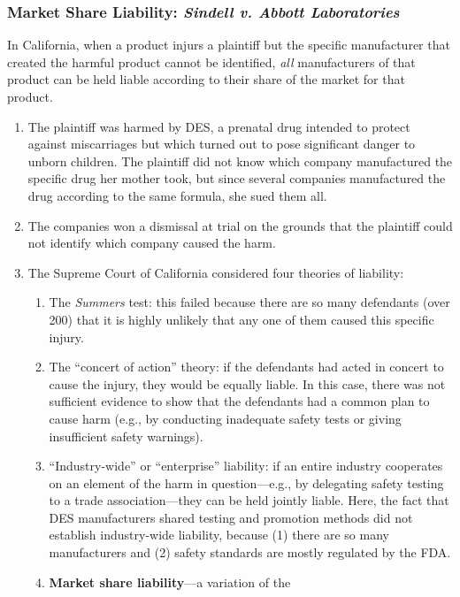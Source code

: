 \subsubsection{Market Share Liability: \emph{Sindell v. Abbott Laboratories}}

In California, when a product injurs a plaintiff but the specific manufacturer 
that created the harmful product cannot be identified, \emph{all} 
manufacturers of that product can be held liable according to their share of 
the market for that product.

\begin{enumerate}
    \item The plaintiff was harmed by DES, a prenatal drug intended to protect 
    against miscarriages but which turned out to pose significant danger to 
    unborn children. The plaintiff did not know which company manufactured the 
    specific drug her mother took, but since several companies manufactured 
    the drug according to the same formula, she sued them all.
    \item The companies won a dismissal at trial on the grounds that the 
    plaintiff could not identify which company caused the harm.
    \item The Supreme Court of California considered four theories of 
    liability:
    \begin{enumerate}
        \item The \emph{Summers} test: this failed because there are so many 
        defendants (over 200) that it is highly unlikely that any one of them 
        caused this specific injury.
        \item The ``concert of action'' theory: if the defendants had acted in 
        concert to cause the injury, they would be equally liable. In this 
        case, there was not sufficient evidence to show that the defendants 
        had a common plan to cause harm (e.g., by conducting inadequate safety 
        tests or giving insufficient safety warnings).
        \item ``Industry-wide'' or ``enterprise'' liability: if an entire 
        industry cooperates on an element of the harm in question---e.g., by 
        delegating safety testing to a trade association---they can be held 
        jointly liable. Here, the fact that DES manufacturers shared testing 
        and promotion methods did not establish industry-wide liability, 
        because (1) there are so many manufacturers and (2) safety standards 
        are mostly regulated by the FDA.
        \item \textbf{Market share liability}---a variation of the 

\end{enumerate}
\end{enumerate}
